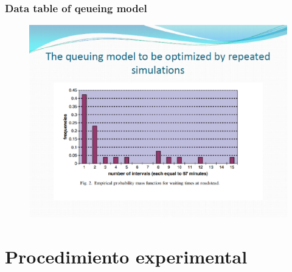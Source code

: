 \documentclass{beamer}
\begin{document}
\begin{frame}
\frametitle{Data table of qeueing model }
\begin{figure}[!th]
\begin{center}
\includegraphics[width=1\textwidth]{img/pic5.eps}
\end{center}
\end{figure}
\end{frame}

\section{Procedimiento experimental}
\end{document}
